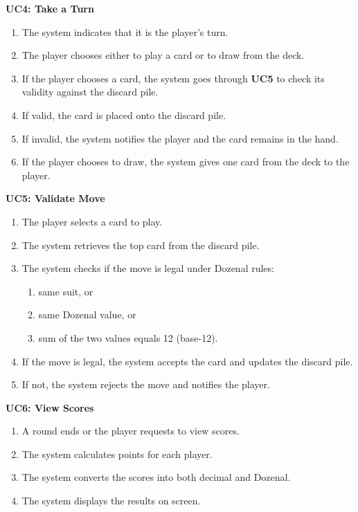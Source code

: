 \documentclass[12pt]{article}
\begin{document}
\noindent\textbf{UC4: Take a Turn}
\begin{enumerate}
    \item The system indicates that it is the player’s turn.
    \item The player chooses either to play a card or to draw from the deck.
    \item If the player chooses a card, the system goes through \textbf{UC5} to check its validity against the discard pile.
    \item If valid, the card is placed onto the discard pile.
    \item If invalid, the system notifies the player and the card remains in the hand.
    \item If the player chooses to draw, the system gives one card from the deck to the player.
\end{enumerate}

\noindent\textbf{UC5: Validate Move}
\begin{enumerate}
    \item The player selects a card to play.
    \item The system retrieves the top card from the discard pile.
    \item The system checks if the move is legal under Dozenal rules:
    \begin{enumerate}
        \item same suit, or
        \item same Dozenal value, or
        \item sum of the two values equals 12 (base-12).
    \end{enumerate}
    \item If the move is legal, the system accepts the card and updates the discard pile.
    \item If not, the system rejects the move and notifies the player.
\end{enumerate}

\noindent\textbf{UC6: View Scores}
\begin{enumerate}
    \item A round ends or the player requests to view scores.
    \item The system calculates points for each player.
    \item The system converts the scores into both decimal and Dozenal.
    \item The system displays the results on screen.
\end{enumerate}
\end{document}
